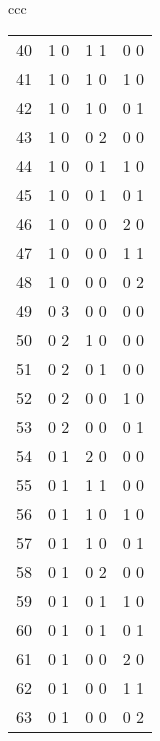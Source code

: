 {\begin{center}
\begin{tabular}{ccc}
\begin{tabular}{rccc}
40\hspace*{.125in}&1 0&1 1&0 0\\
41\hspace*{.125in}&1 0&1 0&1 0\\
42\hspace*{.125in}&1 0&1 0&0 1\\
43\hspace*{.125in}&1 0&0 2&0 0\\
44\hspace*{.125in}&1 0&0 1&1 0\\
45\hspace*{.125in}&1 0&0 1&0 1\\
46\hspace*{.125in}&1 0&0 0&2 0\\
47\hspace*{.125in}&1 0&0 0&1 1\\
48\hspace*{.125in}&1 0&0 0&0 2\\
49\hspace*{.125in}&0 3&0 0&0 0\\
50\hspace*{.125in}&0 2&1 0&0 0\\
51\hspace*{.125in}&0 2&0 1&0 0\\
52\hspace*{.125in}&0 2&0 0&1 0\\
53\hspace*{.125in}&0 2&0 0&0 1\\
54\hspace*{.125in}&0 1&2 0&0 0\\
55\hspace*{.125in}&0 1&1 1&0 0\\
56\hspace*{.125in}&0 1&1 0&1 0\\
57\hspace*{.125in}&0 1&1 0&0 1\\
58\hspace*{.125in}&0 1&0 2&0 0\\
59\hspace*{.125in}&0 1&0 1&1 0\\
60\hspace*{.125in}&0 1&0 1&0 1\\
61\hspace*{.125in}&0 1&0 0&2 0\\
62\hspace*{.125in}&0 1&0 0&1 1\\
63\hspace*{.125in}&0 1&0 0&0 2\\

\end{tabular}
\end{tabular}
\end{center}}
